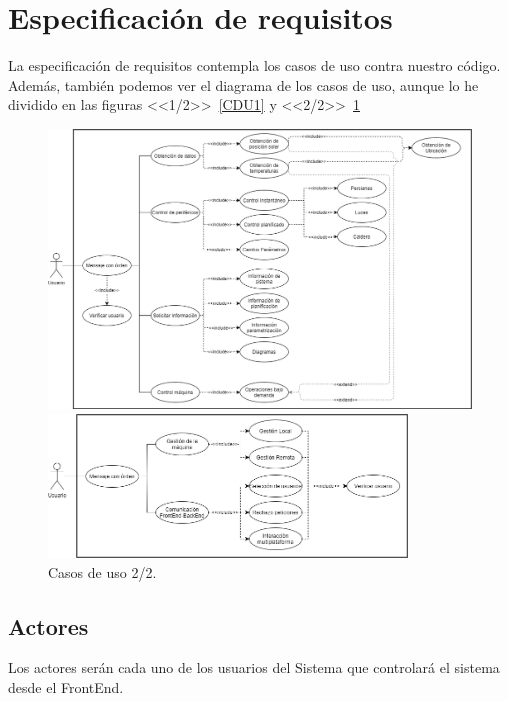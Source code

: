 \section{Especificación de requisitos}
La especificación de requisitos contempla los casos de uso contra nuestro código.
Además, también podemos ver el diagrama de los casos de uso, aunque lo he dividido en las figuras <<1/2>>~\ref{CDU1} y <<2/2>>~\ref{CDU2}

\begin{figure}[h]
\includegraphics[width=1.15\textwidth]{img/Diagramas/CasosDeUso.png}
\caption{Casos de uso 1/2.}\label{CDU1}
\includegraphics[width=0.85\textwidth]{img/Diagramas/CasosDeUsoBackEnd.png}
\caption{Casos de uso 2/2.}\label{CDU2}
\end{figure}

\subsection{Actores}
Los actores serán cada uno de los usuarios del Sistema que controlará el sistema desde el FrontEnd.

